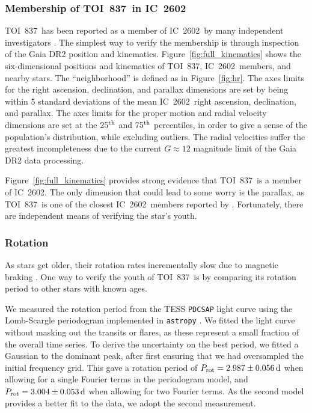 \documentclass[12pt,twocolumn,tighten]{aastex63}
\newcommand{\tn}{TOI~837} %
\newcommand{\cn}{IC~2602} %
\begin{document}
%

\subsubsection{Membership of \tn\ in \cn}
\label{subsec:member}

\tn\ has been reported as a member of \cn\ by many independent
investigators \citep[{\it
e.g.},][]{Kharchenko_et_al_2013,oh_comoving_2017,cantatgaudin_gaia_2018,damiani_stellar_2019,kounkel_untangling_2019}.
The simplest way to verify the membership is through inspection of the
Gaia DR2 position and kinematics.  Figure~\ref{fig:full_kinematics}
shows the six-dimensional positions and kinematics of \tn, \cn\
members, and nearby stars.  The ``neighborhood'' is defined as in
Figure~\ref{fig:hr}.  The axes limits for the right ascension,
declination, and parallax dimensions are set by being within 5
standard deviations of the mean \cn\ right ascension, declination, and
parallax.  The axes limits for the proper motion and radial velocity
dimensions are set at the 25$^{\rm th}$ and 75$^{\rm th}$ percentiles,
in order to give a sense of the population's distribution, while
excluding outliers.  The radial velocities suffer the greatest
incompleteness due to the current $G\approx12$ magnitude limit of the
Gaia DR2 data processing.

Figure~\ref{fig:full_kinematics} provides strong evidence that \tn\ is
a member of \cn.  The only dimension that could lead to some worry is
the parallax, as \tn\ is one of the closest \cn\ members reported by
\citet{cantatgaudin_gaia_2018}.  Fortunately, there are independent
means of verifying the star's youth.

\subsubsection{Rotation}

As stars get older, their rotation rates incrementally slow due to
magnetic braking \cite{weber_angular_1967,skumanich_time_1972}.  One
way to verify the youth of \tn\ is by comparing its rotation period to
other stars with known ages.

We measured the rotation period from the TESS \texttt{PDCSAP} light curve using the
Lomb-Scargle periodogram implemented in \texttt{astropy}
\citep{lomb_1976,scargle_studies_1982,vanderplas_periodograms_2015}.
We fitted the light curve without masking out the transits or flares,
as these represent a small fraction of the overall time series.  To
derive the uncertainty on the best period, we fitted a Gaussian to the
dominant peak, after first ensuring that we had oversampled the
initial frequency grid.  This gave a rotation period of $P_{\rm rot} =
2.987 \pm 0.056\,{\rm d}$ when allowing for a single Fourier terms in
the periodogram model, and $P_{\rm rot} = 3.004 \pm 0.053\,{\rm d}$
when allowing for two Fourier terms.  As the second model provides a
better fit to the data, we adopt the second measurement.
\end{document}
